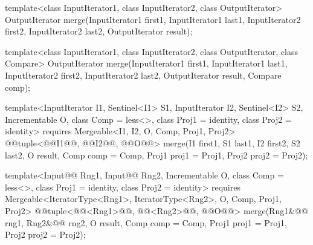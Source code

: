 %
\begin{removedblock}
\begin{itemdecl}
template<class InputIterator1, class InputIterator2,
         class OutputIterator>
  OutputIterator
    merge(InputIterator1 first1, InputIterator1 last1,
          InputIterator2 first2, InputIterator2 last2,
          OutputIterator result);

template<class InputIterator1, class InputIterator2,
         class OutputIterator, class Compare>
  OutputIterator
    merge(InputIterator1 first1, InputIterator1 last1,
          InputIterator2 first2, InputIterator2 last2,
          OutputIterator result, Compare comp);
\end{itemdecl}
\end{removedblock}
\begin{addedblock}
\begin{itemdecl}
template<InputIterator I1, Sentinel<I1> S1, InputIterator I2, Sentinel<I2> S2,
    Incrementable O, class Comp = less<>, class Proj1 = identity,
    class Proj2 = identity>
  requires Mergeable<I1, I2, O, Comp, Proj1, Proj2>
  @@tuple<@@I1@\newtxt{)}@, @@I2@\newtxt{)}@, @@O@\newtxt{)}@>
    merge(I1 first1, S1 last1, I2 first2, S2 last2, O result,
          Comp comp = Comp{}, Proj1 proj1 = Proj1{}, Proj2 proj2 = Proj2{});

template<Input@@ Rng1, Input@@ Rng2, Incrementable O, class Comp = less<>,
    class Proj1 = identity, class Proj2 = identity>
  requires Mergeable<IteratorType<Rng1>, IteratorType<Rng2>, O, Comp, Proj1, Proj2>
  @@tuple<@@<Rng1>@\newtxt{)}@,
               @@<Rng2>@\newtxt{)}@,
               @@O@\newtxt{)}@>
    merge(Rng1&@\newtxt{\&}@ rng1, Rng2&@\newtxt{\&}@ rng2, O result,
          Comp comp = Comp{}, Proj1 proj1 = Proj1{}, Proj2 proj2 = Proj2{});
\end{itemdecl}
\end{addedblock}

